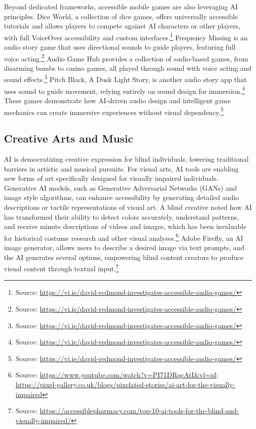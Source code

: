 Beyond dedicated frameworks, accessible mobile games are also leveraging AI principles. Dice World, a collection of dice games, offers universally accessible tutorials and allows players to compete against AI characters or other players, with full VoiceOver accessibility and custom interfaces.\footnote{Source: \url{https://vi.ie/david-redmond-investigates-accessible-audio-games/}} Frequency Missing is an audio story game that uses directional sounds to guide players, featuring full voice acting.\footnote{Source: \url{https://vi.ie/david-redmond-investigates-accessible-audio-games/}} Audio Game Hub provides a collection of audio-based games, from disarming bombs to casino games, all played through sound with voice acting and sound effects.\footnote{Source: \url{https://vi.ie/david-redmond-investigates-accessible-audio-games/}} Pitch Black, A Dusk Light Story, is another audio story app that uses sound to guide movement, relying entirely on sound design for immersion.\footnote{Source: \url{https://vi.ie/david-redmond-investigates-accessible-audio-games/}} These games demonstrate how AI-driven audio design and intelligent game mechanics can create immersive experiences without visual dependency.\footnote{Source: \url{https://vi.ie/david-redmond-investigates-accessible-audio-games/}}

\subsection{Creative Arts and Music}

AI is democratizing creative expression for blind individuals, lowering traditional barriers in artistic and musical pursuits. For visual arts, AI tools are enabling new forms of art specifically designed for visually impaired individuals. Generative AI models, such as Generative Adversarial Networks (GANs) and image style algorithms, can enhance accessibility by generating detailed audio descriptions or tactile representations of visual art. A blind creative noted how AI has transformed their ability to detect colors accurately, understand patterns, and receive minute descriptions of videos and images, which has been invaluable for historical costume research and other visual analyses.\footnote{Source: \url{https://www.youtube.com/watch?v=PI71DRqcAtI&vl=id}; \url{https://pixel-gallery.co.uk/blogs/pixelated-stories/ai-art-for-the-visually-impaired}} Adobe Firefly, an AI image generator, allows users to describe a desired image via text prompts, and the AI generates several options, empowering blind content creators to produce visual content through textual input.\footnote{Source: \url{https://accessiblepharmacy.com/top-10-ai-tools-for-the-blind-and-visually-impaired/}}

